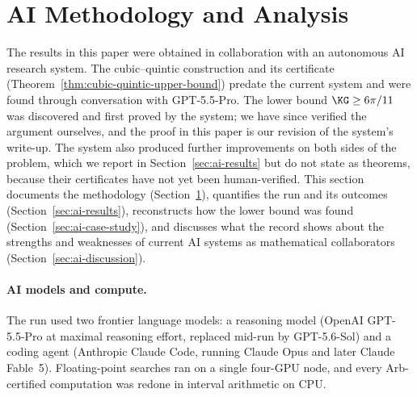
\hypersetup{
  colorlinks=true,
  linkcolor=blue!55!black,
  urlcolor=blue!55!black,
  citecolor=blue!55!black
}

\setlength{\parindent}{0pt}
\setlength{\parskip}{6pt}

\section{AI Methodology and Analysis}
\label{sec:ai-methodology}

The results in this paper were obtained in collaboration with an autonomous
AI research system. The cubic--quintic
construction and its certificate (Theorem~\ref{thm:cubic-quintic-upper-bound})
predate the current system and were found through conversation with GPT-5.5-Pro. The lower bound $\KG\ge6\pi/11$ was
discovered and first proved by the system; we have since verified the
argument ourselves, and the proof in this paper is our revision of the
system's write-up. The system also produced further improvements on both
sides of the problem, which we report in Section~\ref{sec:ai-results} but do
not state as theorems, because their certificates have not yet been human-verified. This section documents the methodology
(Section~\ref{sec:ai-methodology}), quantifies the run and its outcomes
(Section~\ref{sec:ai-results}), reconstructs how the lower bound was found
(Section~\ref{sec:ai-case-study}), and discusses what the record shows about
the strengths and weaknesses of current AI systems as mathematical
collaborators (Section~\ref{sec:ai-discussion}).


\paragraph{AI models and compute.}
The run used two frontier language models: a reasoning model (OpenAI
GPT-5.5-Pro at maximal reasoning effort, replaced mid-run by GPT-5.6-Sol)
and a coding agent (Anthropic Claude Code, running Claude Opus and later
Claude Fable~5). Floating-point searches
ran on a single four-GPU node, and every Arb-certified computation was redone in interval arithmetic on CPU.

